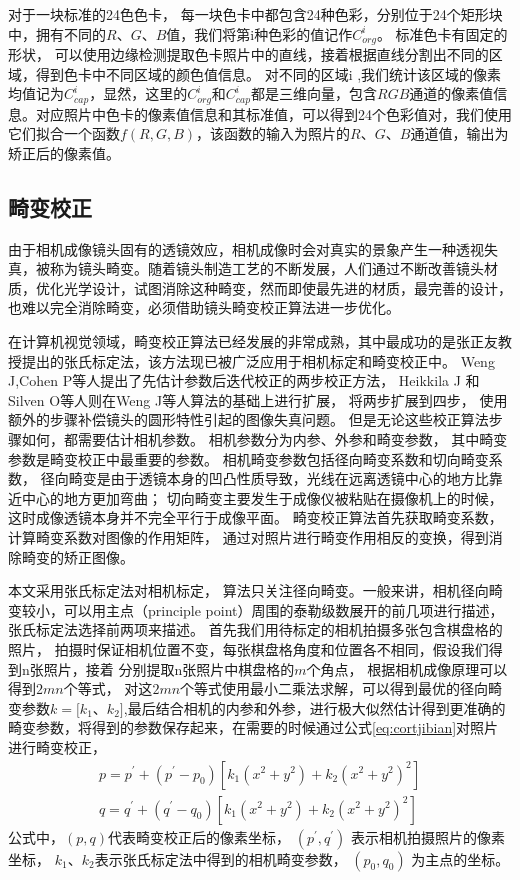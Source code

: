 对于一块标准的24色色卡，
 每一块色卡中都包含24种色彩，分别位于24个矩形块中，拥有不同的$R$、$G$、$B$值，我们将第i种色彩的值记作$C_{org}^i$。
 标准色卡有固定的形状，
 可以使用边缘检测提取色卡照片中的直线，接着根据直线分割出不同的区域，得到色卡中不同区域的颜色值信息。
 对不同的区域i ,我们统计该区域的像素均值记为$C_{cap}^i$，显然，这里的$C_{org}^i$和$C_{cap}^i$都是三维向量，包含$RGB$通道的像素值信息。对应照片中色卡的像素值信息和其标准值，可以得到24个色彩值对，我们使用它们拟合一个函数$f(R,G,B)$，该函数的输入为照片的$R$、$G$、$B$通道值，输出为矫正后的像素值。


\subsection{畸变校正}

由于相机成像镜头固有的透镜效应，相机成像时会对真实的景象产生一种透视失真，被称为镜头畸变。随着镜头制造工艺的不断发展，人们通过不断改善镜头材质，优化光学设计，试图消除这种畸变，然而即使最先进的材质，最完善的设计，也难以完全消除畸变，必须借助镜头畸变校正算法进一步优化。

在计算机视觉领域，畸变校正算法已经发展的非常成熟，其中最成功的是张正友教授提出的张氏标定法\cite{zhang2000flexible}，该方法现已被广泛应用于相机标定和畸变校正中。
Weng J,Cohen P\cite{weng1992camera}等人提出了先估计参数后迭代校正的两步校正方法，
Heikkila J 和Silven O\cite{heikkila1997four}等人则在Weng J等人算法的基础上进行扩展，
将两步扩展到四步，
使用额外的步骤补偿镜头的圆形特性引起的图像失真问题。
但是无论这些校正算法步骤如何，都需要估计相机参数。
相机参数分为内参、外参和畸变参数，
其中畸变参数是畸变校正中最重要的参数。
相机畸变参数包括径向畸变系数和切向畸变系数，
径向畸变是由于透镜本身的凹凸性质导致，光线在远离透镜中心的地方比靠近中心的地方更加弯曲；
切向畸变主要发生于成像仪被粘贴在摄像机上的时候，
这时成像透镜本身并不完全平行于成像平面。
畸变校正算法首先获取畸变系数，计算畸变系数对图像的作用矩阵，
通过对照片进行畸变作用相反的变换，得到消除畸变的矫正图像。

本文采用张氏标定法对相机标定，
算法只关注径向畸变。一般来讲，相机径向畸变较小，可以用主点（principle point）周围的泰勒级数展开的前几项进行描述，张氏标定法选择前两项来描述。
首先我们用待标定的相机拍摄多张包含棋盘格的照片，
拍摄时保证相机位置不变，每张棋盘格角度和位置各不相同，假设我们得到n张照片，接着
分别提取n张照片中棋盘格的$m$个角点，
根据相机成像原理可以得到$2mn$个等式，
对这$2mn$个等式使用最小二乘法求解，可以得到最优的径向畸变参数$k=[k_{1}$、$k_{2}]$,最后结合相机的内参和外参，进行极大似然估计得到更准确的畸变参数，将得到的参数保存起来，在需要的时候通过公式\eqref{eq:cortjibian}对照片进行畸变校正，
\begin{equation}\label{eq:cortjibian}
\begin{split}
p=p^{'}+(p^{'}-p_{0} )[k_{1} (x^{2}+y^{2} )+k_{2} (x^{2}+y^{2} )^{2} ]\\
q=q^{'}+(q^{'}-q_{0} )[k_{1} (x^{2}+y^{2} )+k_{2} (x^{2}+y^{2} )^{2} ]
\end{split}
\end{equation}
公式中，$(p,q)$代表畸变校正后的像素坐标，
$(p^{'}, q^{'})$
表示相机拍摄照片的像素坐标，
$k_{1}$、$k_{2}$表示张氏标定法中得到的相机畸变参数，
$(p_{0},q_{0})$
为主点的坐标。

